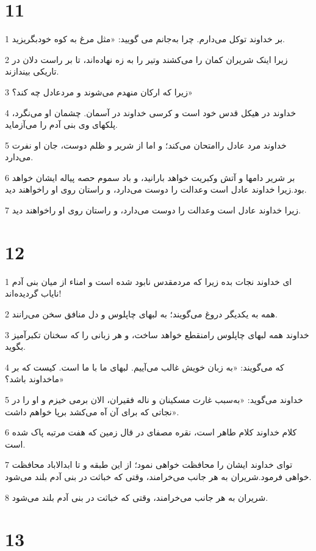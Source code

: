 \chapter{11}

\par 1 بر خداوند توکل می‌دارم. چرا به‌جانم می گویید: «مثل مرغ به کوه خودبگریزید.
\par 2 زیرا اینک شریران کمان را می‌کشند وتیر را به زه نهاده‌اند، تا بر راست دلان در تاریکی بیندازند.
\par 3 زیرا که ارکان منهدم می‌شوند و مردعادل چه کند؟»
\par 4 خداوند در هیکل قدس خود است و کرسی خداوند در آسمان. چشمان او می‌نگرد، پلکهای وی بنی آدم را می‌آزماید.
\par 5 خداوند مرد عادل راامتحان می‌کند؛ و اما از شریر و ظلم دوست، جان او نفرت می‌دارد.
\par 6 بر شریر دامها و آتش وکبریت خواهد بارانید، و باد سموم حصه پیاله ایشان خواهد بود.زیرا خداوند عادل است وعدالت را دوست می‌دارد، و راستان روی او راخواهند دید.
\par 7 زیرا خداوند عادل است وعدالت را دوست می‌دارد، و راستان روی او راخواهند دید.
 
\chapter{12}

\par 1 ای خداوند نجات بده زیرا که مردمقدس نابود شده است و امناء از میان بنی آدم نایاب گردیده‌اند!
\par 2 همه به یکدیگر دروغ می‌گویند؛ به لبهای چاپلوس و دل منافق سخن می‌رانند.
\par 3 خداوند همه لبهای چاپلوس رامنقطع خواهد ساخت، و هر زبانی را که سخنان تکبرآمیز بگوید.
\par 4 که می‌گویند: «به زبان خویش غالب می‌آییم. لبهای ما با ما است. کیست که بر ماخداوند باشد؟»
\par 5 خداوند می‌گوید: «به‌سبب غارت مسکینان و ناله فقیران، الان برمی خیزم و او را در نجاتی که برای آن آه می‌کشد برپا خواهم داشت».
\par 6 کلام خداوند کلام طاهر است، نقره مصفای در قال زمین که هفت مرتبه پاک شده است.
\par 7 تو‌ای خداوند ایشان را محافظت خواهی نمود؛ از این طبقه و تا ابدالاباد محافظت خواهی فرمود.شریران به هر جانب می‌خرامند، وقتی که خباثت در بنی آدم بلند می‌شود.
\par 8 شریران به هر جانب می‌خرامند، وقتی که خباثت در بنی آدم بلند می‌شود.
 
\chapter{13}

